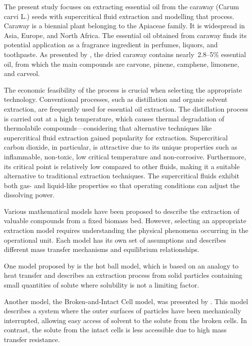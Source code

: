 \documentclass[../Article_Design_of_Experiment.tex]{subfiles}
\begin{document}
	
	The present study focuses on extracting essential oil from the caraway (Carum carvi L.) seeds with supercritical fluid extraction and modelling that process. Caraway is a biennial plant belonging to the Apiaceae family. It is widespread in Asia, Europe, and North Africa. The essential oil obtained from caraway finds its potential application as a fragrance ingredient in perfumes, liquors, and toothpaste. As presented by \citet{Hromis2015}, the dried caraway contains nearly~2.8–5\% essential oil, from which the main compounds are carvone, pinene, camphene, limonene, and carveol. 
	
	The economic feasibility of the process is crucial when selecting the appropriate technology. Conventional processes, such as distillation and organic solvent extraction, are frequently used for essential oil extraction. The distillation process is carried out at a high temperature, which causes thermal degradation of thermolabile compounds—considering that alternative techniques like supercritical fluid extraction gained popularity for extraction. Supercritical carbon dioxide, in particular, is attractive due to its unique properties such as inflammable, non-toxic, low critical temperature and non-corrosive. Furthermore, its critical point is relatively low compared to other fluids, making it a suitable alternative to traditional extraction techniques. The supercritical fluids exhibit both gas- and liquid-like properties so that operating conditions can adjust the dissolving power.
	
	Various mathematical models have been proposed to describe the extraction of valuable compounds from a fixed biomass bed. However, selecting an appropriate extraction model requires understanding the physical phenomena occurring in the operational unit. Each model has its own set of assumptions and describes different mass transfer mechanisms and equilibrium relationships.
	
	One model proposed by \citet{Reverchon1993} is the hot ball model, which is based on an analogy to heat transfer and describes an extraction process from solid particles containing small quantities of solute where solubility is not a limiting factor. 
	
	Another model, the Broken-and-Intact Cell model, was presented by \citet{Sovova1994}. This model describes a system where the outer surfaces of particles have been mechanically interrupted, allowing easy access of solvent to the solute from the broken cells. In contrast, the solute from the intact cells is less accessible due to high mass transfer resistance.
	
\end{document}
